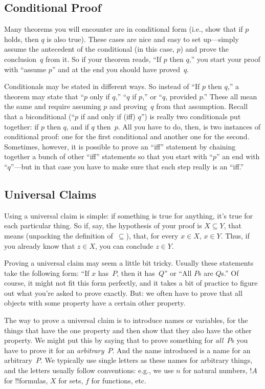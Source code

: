\documentclass[../../../include/open-logic-section]{subfiles}
\begin{document}
\subsection{Conditional Proof}

Many theorems you will encounter are in conditional form (i.e., show
that if $p$ holds, then $q$ is also true). These cases are nice and
easy to set up---simply assume the antecedent of the conditional (in
this case, $p$) and prove the conclusion~$q$ from it.  So if your
theorem reads, ``If $p$ then $q$,'' you start your proof with ``assume
$p$'' and at the end you should have proved~$q$.

Conditionals may be stated in different ways. So instead of ``If $p$
then $q$,'' a theorem may state that ``$p$ only if $q$,'' ``$q$ if
$p$,'' or ``$q$, provided $p$.'' These all mean the same and require
assuming $p$ and proving~$q$ from that assumption.  Recall that a
biconditional (``$p$ if and only if (iff) $q$'') is really two
conditionals put together: if $p$ then $q$, and if $q$ then~$p$. All
you have to do, then, is two instances of conditional proof: one for
the first conditional and another one for the second. Sometimes,
however, it is possible to prove an ``iff'' statement by chaining
together a bunch of other ``iff'' statements so that you start with
``$p$'' an end with ``$q$''---but in that case you have to make sure
that each step really is an ``iff.''

\subsection{Universal Claims}

Using a universal claim is simple: if something is true for anything,
it's true for each particular thing.  So if, say, the hypothesis of
your proof is $X \subseteq Y$, that means (unpacking the definition
of~$\subseteq$), that, for every $x \in X$, $x \in Y$. Thus, if you
already know that $z \in X$, you can conclude $z \in Y$.

Proving a universal claim may seem a little bit tricky. Usually these
statements take the following form: ``If $x$ has~$P$, then it
has~$Q$'' or ``All $P$s are $Q$s.'' Of course, it might not fit this
form perfectly, and it takes a bit of practice to figure out what
you're asked to prove exactly. But: we often have to prove that all objects
with some property have a certain other property.

The way to prove a universal claim is to introduce names or variables,
for the things that have the one property and then show that they also
have the other property.  We might put this by saying that to prove
something for \emph{all}~$P$s you have to prove it for an
\emph{arbitrary}~$P$. And the name introduced is a name for an
arbitrary~$P$.  We typically use single letters as these names for
arbitrary things, and the letters usually follow conventions: e.g., we
use $n$ for natural numbers, $!A$ for !!{formula}s, $X$ for sets, $f$
for functions, etc.
\end{document}
